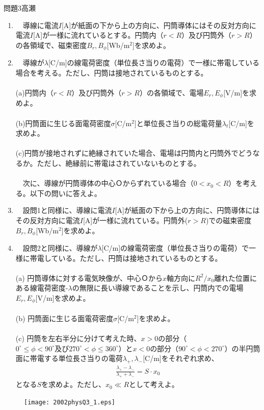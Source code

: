 \documentclass[fleqn]{jbook}
\begin{document}
\begin{question}{問題3}{高瀬}
\begin{enumerate}
	\item　導線に電流$I$[A]が紙面の下から上の方向に、円筒導体にはその反対方向に電流$I$[A]が一様に流れているとする。円筒内（$r<R$）及び円筒外（$r>R$）の各領域で、磁束密度$B_r,B_\phi$[Wb/m$^2$]を求めよ。
	\\
	\item　導線が$\lambda$[C/m]の線電荷密度（単位長さ当りの電荷）で一様に帯電している場合を考える。ただし、円筒は接地されているものとする。
	\\
	\\
	(a)円筒内（$r<R$）及び円筒外（$r>R$）の各領域で、電場$E_r,E_\phi$[V/m]を求めよ。
	\\
	\\
	(b)円筒面に生じる面電荷密度$\sigma$[C/m$^2$]と単位長さ当りの総電荷量$\lambda_t$[C/m]を求めよ。
	\\
	\\
	(c)円筒が接地されずに絶縁されていた場合、電場は円筒内と円筒外でどうなるか。ただし、絶縁前に帯電はされていないものとする。
	\\
	\\
	\newpage
	　次に、導線が円筒導体の中心Ｏからずれている場合（$0<x_0<R$）を考える。以下の問いに答えよ。
	\\
	\item　設問1と同様に、導線に電流$I$[A]が紙面の下から上の方向に、円筒導体にはその反対方向に電流$I$[A]が一様に流れている。円筒外($r>R$)での磁束密度$B_r,B_\phi$[Wb/m$^2$]を求めよ。
	\\
	\item　設問2と同様に、導線が$\lambda$[C/m]の線電荷密度（単位長さ当りの電荷）で一様に帯電している。ただし、円筒は接地されているものとする。
	\\
	\\
	(a) 円筒導体に対する電気映像が、中心Ｏから$x$軸方向に$R^2/x_0$離れた位置にある線電荷密度-$\lambda$の無限に長い導線であることを示し、円筒内での電場$E_r,E_\phi$[V/m]を求めよ。
	\\
	\\
	(b) 円筒面に生じる面電荷密度$\sigma$[C/m$^2$]を求めよ。
	\\
	\\
	(c) 円筒を左右半分に分けて考えた時、$x>0$の部分（$0^{\circ} \le \phi < 90^{\circ}及び270^{\circ} < \phi \le 360^{\circ}$）と$x<0$の部分（$90^{\circ} < \phi <270^{\circ}$）の半円筒面に帯電する単位長さ当りの電荷$\lambda_+,\lambda_-$[C/m]をそれぞれ求め、
	\begin{eqnarray}
	\frac{\lambda_+ - \lambda_-}{\lambda_+ + \lambda_-} = S \cdot x_0
	\end{eqnarray}
	となる$S$を求めよ。ただし、$x_0 \ll R$として考えよ。
\end{enumerate}

\begin{figure}[htbp]
	\begin{center}
	\texttt{[image: 2002physQ3\_1.eps]}  
	\caption{}
	\end{center}
\end{figure}

\end{question}
\end{document}
